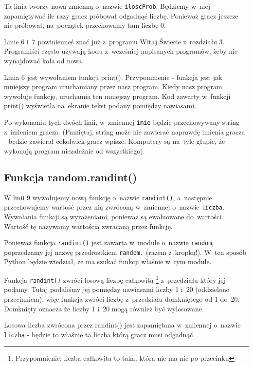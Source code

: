 \documentclass{book}
\begin{document}
Ta linia tworzy nową zmienną o~nazwie \lstinline{iloscProb}. Będziemy w~niej zapamiętywać ile razy gracz próbował odgadnąć liczbę. Ponieważ gracz jeszcze nie próbował, na~początek przechowamy tam liczbę 0.



Linie 6 i~7 powinienneś znać już z~programu Witaj Świecie z~rozdziału 3. Programiści często używają kodu z~wcześniej napisanych programów, żeby nie wynajdować koła od nowa.

Linia 6 jest wywołaniem funkcji print(). Przypomnienie - funkcja jest jak mniejszy program uruchamiany przez nasz program. Kiedy nasz program wywołuje funkcję, uruchamia ten mniejszy program. Kod zawarty w~funkcji print() wyświetla na~ekranie tekst podany pomiędzy nawiasami.

Po wykonaniu tych dwóch linii, w~zmiennej \lstinline{imie} będzie przechowywany string z~imieniem gracza. (Pamiętaj, string może nie zawierać naprawdę imienia gracza - będzie zawierał cokolwiek gracz wpisze. Komputery są na~tyle głupie, że wykonują program niezależnie od wszystkiego).

\subsection{Funkcja random.randint()}



W linii 9 wywołujemy nową  funkcję o~nazwie \lstinline{randint()}, a~następnie przechowujemy wartość przez nią zwróconą w~zmiennej o~nazwie \lstinline{liczba}. Wywołania funkcji są wyrażeniami, ponieważ są ewaluowane do~wartości. Wartość tę nazywamy wartością zwracaną przez funkcję.

Ponieważ funkcja \lstinline{randint()} jest zawarta w~module o~nazwie \lstinline{random}, poprzedzamy jej nazwę przedrostkiem \lstinline{random.} (razem z~kropką!). W~ten sposób Python będzie wiedział, że ma szukać funkcji właśnie w~tym module.

Funkcja \lstinline{randint()} zwróci losową liczbę całkowitą \footnote{Przypomnienie: liczba całkowita to taka, która nie ma nic po przecinku} z~przedziału który jej podamy. Tutaj podaliśmy jej pomiędzy nawiasami liczby 1 i~20 (oddzielone przecinkiem), więc funkcja zwróci liczbę z~przedziału domkniętego od 1 do~20. Domknięty oznacza że liczby 1 i~20 mogą również być wylosowane. 

Losowa liczba zwrócona przez randint() jest zapamiętana w~zmiennej o~nazwie \lstinline{liczba} - będzie to właśnie ta liczba którą gracz musi odgadnąć.
\end{document}
